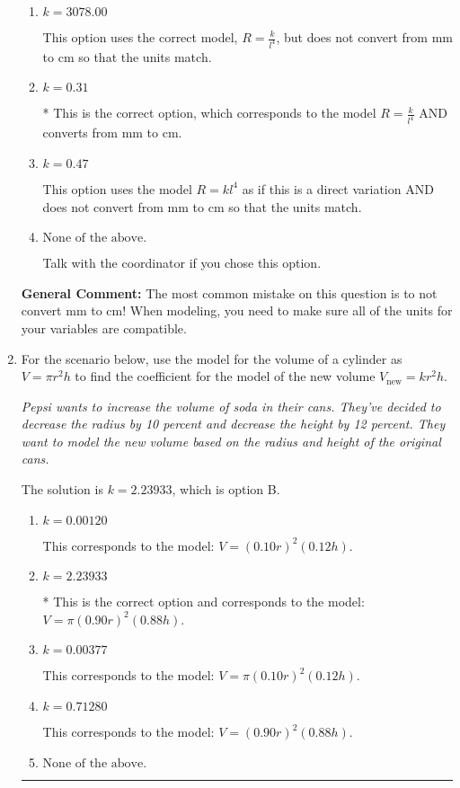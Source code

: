 \documentclass{extbook}[14pt]
\newcommand{\litem}[1]{\item #1

\rule{\textwidth}{0.4pt}}
\begin{document}
\begin{enumerate}
{\begin{enumerate}[label=\Alph*.]
This option uses the model $R = kl^{4}$ as if this is a direct variation.
\item \( k = 3078.00 \)

This option uses the correct model, $R = \frac{k}{l^{4}}$, but does not convert from mm to cm so that the units match.
\item \( k = 0.31 \)

* This is the correct option, which corresponds to the model $R = \frac{k}{l^{4}}$ AND converts from mm to cm.
\item \( k = 0.47 \)

This option uses the model $R = kl^{4}$ as if this is a direct variation AND does not convert from mm to cm so that the units match.
\item \( \text{None of the above.} \)

Talk with the coordinator if you chose this option.
\end{enumerate}

\textbf{General Comment:} The most common mistake on this question is to not convert mm to cm! When modeling, you need to make sure all of the units for your variables are compatible.
}
\litem{
For the scenario below, use the model for the volume of a cylinder as $V = \pi r^2 h$ to find the coefficient for the model of the new volume $V_{\text{new}} = k r^2 h$.

\begin{center}
    \textit{ Pepsi wants to increase the volume of soda in their cans. They've decided to decrease the radius by 10 percent and decrease the height by 12 percent. They want to model the new volume based on the radius and height of the original cans. }
\end{center}
The solution is \( k = 2.23933 \), which is option B.\begin{enumerate}[label=\Alph*.]
\item \( k = 0.00120 \)

This corresponds to the model: $V = (0.10 r)^2 (0.12 h)$.
\item \( k = 2.23933 \)

* This is the correct option and corresponds to the model: $V = \pi (0.90 r)^2 (0.88 h)$.
\item \( k = 0.00377 \)

This corresponds to the model: $V = \pi (0.10 r)^2 (0.12 h)$.
\item \( k = 0.71280 \)

This corresponds to the model: $V = (0.90 r)^2 (0.88 h)$.
\item \( \text{None of the above.} \)


\end{enumerate}}
\end{enumerate}
\end{document}
